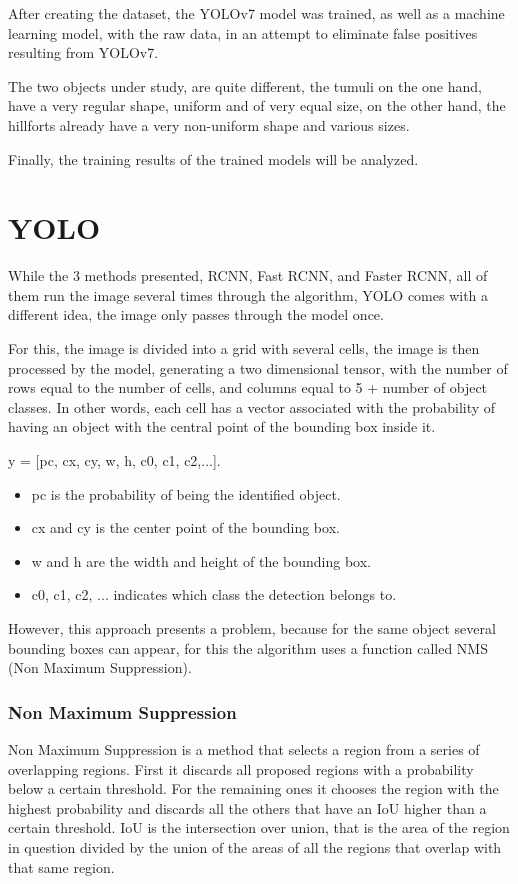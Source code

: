 After creating the dataset, the YOLOv7 model was trained, as well as a
machine learning model, with the raw data, in an attempt to eliminate false positives resulting from YOLOv7.

The two objects under study, are quite different, the tumuli on the one hand, have a very regular shape, uniform and of very equal size, on the other hand, the hillforts already have a very non-uniform shape and various sizes.

Finally, the training results of the trained models will be analyzed.


\section{YOLO}
While the 3 methods presented, RCNN, Fast RCNN, and Faster RCNN, all of them run the image several times through the algorithm, YOLO comes with a different idea, the image only passes through the model once.

For this, the image is divided into a grid with several cells, the image is then processed by the model, generating a two dimensional tensor, with the number of rows equal to the number of cells, and columns equal to 5 + number of object classes. In other words, each cell has a vector associated with the probability of having an object with the central point of the bounding box inside it.

y = [pc, cx, cy, w, h, c0, c1, c2,...].

\begin{itemize}
    \item pc is the probability of being the identified object.
    \item cx and cy is the center point of the bounding box.
    \item w and h are the width and height of the bounding box.
    \item c0, c1, c2, ... indicates which class the detection belongs to.
\end{itemize}

However, this approach presents a problem, because for the same object several bounding boxes can appear, for this the algorithm uses a function called NMS (Non Maximum Suppression).

\subsubsection{Non Maximum Suppression}
Non Maximum Suppression \cite{nonmaxsurpression} is a method that selects a region from a series of overlapping regions. First it discards all proposed regions with a probability below a certain threshold. For the remaining ones it chooses the region with the highest probability and discards all the others that have an IoU higher than a certain threshold.
IoU is the intersection over union, that is the area of the region in question divided by the union of the areas of all the regions that overlap with that same region.

